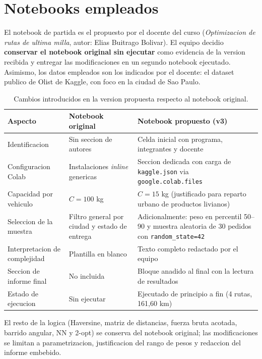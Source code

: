 \documentclass[11pt,a4paper]{article}
\begin{document}
\section{Notebooks empleados}
El notebook de partida es el propuesto por el docente del curso
(\emph{Optimizacion de rutas de ultima milla}, autor: Elias Buitrago
Bolivar). El equipo decidio \textbf{conservar el notebook original sin
ejecutar} como evidencia de la version recibida y entregar las
modificaciones en un segundo notebook ejecutado. Asimismo, los datos
empleados son los indicados por el docente: el dataset publico de Olist
de Kaggle, con foco en la ciudad de Sao Paulo.

\begin{table}[h!]
\centering
\caption{Cambios introducidos en la version propuesta respecto al notebook original.}
\label{tab:nb-cambios}
\begin{tabular}{p{3.5cm}p{4.7cm}p{5.2cm}}
\toprule
\textbf{Aspecto} & \textbf{Notebook original} & \textbf{Notebook propuesto (v3)} \\
\midrule
Identificacion       & Sin seccion de autores                 & Celda inicial con programa, integrantes y docente \\
Configuracion Colab  & Instalaciones \emph{inline} genericas  & Seccion dedicada con carga de \texttt{kaggle.json} via \texttt{google.colab.files} \\
Capacidad por vehiculo & $C = 100$ kg                         & $C = 15$ kg (justificado para reparto urbano de productos livianos) \\
Seleccion de la muestra & Filtro general por ciudad y estado de entrega & Adicionalmente: peso en percentil 50--90 y muestra aleatoria de 30 pedidos con \texttt{random\_state=42} \\
Interpretacion de complejidad & Plantilla en blanco           & Texto completo redactado por el equipo \\
Seccion de informe final & No incluida                        & Bloque anadido al final con la lectura de resultados \\
Estado de ejecucion  & Sin ejecutar                           & Ejecutado de principio a fin (4 rutas, 161,60 km) \\
\bottomrule
\end{tabular}
\end{table}

El resto de la logica (Haversine, matriz de distancias, fuerza bruta
acotada, barrido angular, NN y 2-opt) se conserva del notebook
original; las modificaciones se limitan a parametrizacion, justificacion
del rango de pesos y redaccion del informe embebido.
\end{document}
